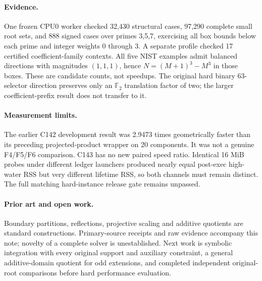 \documentclass[11pt]{article}
\begin{document}
\paragraph{Evidence.} One frozen CPU0 worker checked 32,430 structural cases, 97,290 complete small root sets, and 888 signed cases over primes 3,5,7, exercising all box bounds below each prime and integer weights 0 through 3. A separate profile checked 17 certified coefficient-family contexts. All five NIST examples admit balanced directions with magnitudes $(1,1,1)$, hence $N=(M+1)^3-M^3$ in those boxes. These are candidate counts, not speedups. The original hard binary 63-selector direction preserves only an $\mathbb F_2$ translation factor of two; the larger coefficient-prefix result does not transfer to it.

\paragraph{Measurement limits.} The earlier C142 development result was 2.9473 times geometrically faster than its preceding projected-product wrapper on 20 components. It was not a genuine F4/F5/F6 comparison. C143 has no new paired speed ratio. Identical 16 MiB probes under different ledger launchers produced nearly equal post-exec high-water RSS but very different lifetime RSS, so both channels must remain distinct. The full matching hard-instance release gate remains unpassed.

\paragraph{Prior art and open work.} Boundary partitions, reflections, projective scaling and additive quotients are standard constructions. Primary-source receipts and raw evidence accompany this note; novelty of a complete solver is unestablished. Next work is symbolic integration with every original support and auxiliary constraint, a general additive-domain quotient for odd extensions, and completed independent original-root comparisons before hard performance evaluation.
\end{document}
